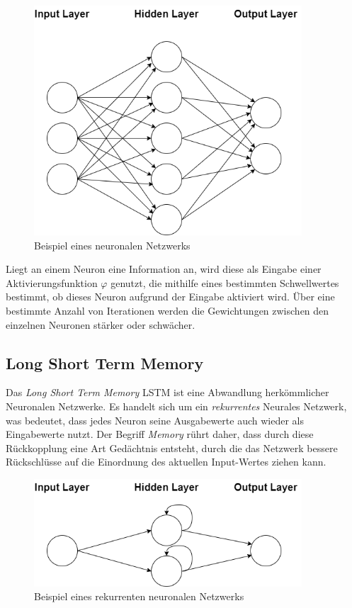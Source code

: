 \begin{figure}[h]
    \centering
    \includegraphics[width=10.0cm]{pic/NN.png}
    \caption{Beispiel eines neuronalen Netzwerks}
    \label{fig:NN}
\end{figure}

Liegt an einem Neuron eine Information an, wird diese als Eingabe einer Aktivierungsfunktion $\varphi$ genutzt, 
die mithilfe eines bestimmten Schwellwertes bestimmt, ob dieses Neuron aufgrund der Eingabe aktiviert wird. Über eine 
bestimmte Anzahl von Iterationen werden die Gewichtungen zwischen den einzelnen Neuronen stärker oder schwächer.


\subsection{Long Short Term Memory}
Das \textit{Long Short Term Memory} LSTM ist eine Abwandlung herkömmlicher Neuronalen Netzwerke. Es handelt sich um ein
\textit{rekurrentes} Neurales Netzwerk, was bedeutet, dass jedes Neuron seine Ausgabewerte auch wieder als Eingabewerte
nutzt. Der Begriff \textit{Memory} rührt daher, dass durch diese Rückkopplung eine Art Gedächtnis entsteht, durch 
die das Netzwerk bessere Rückschlüsse auf die Einordnung des aktuellen Input-Wertes ziehen kann.\\

\begin{figure}[h]
    \centering
    \includegraphics[width=10.0cm]{pic/RecurrentNN.png}
    \caption{Beispiel eines rekurrenten neuronalen Netzwerks}
    \label{fig:RecNN}
\end{figure}

